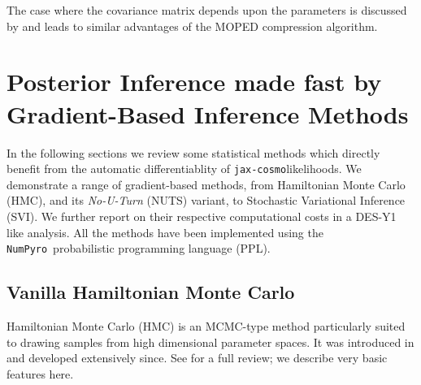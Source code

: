 \documentclass[twocolumn,twocolappendix,nofootinbib,iop]{openjournal}
\newcommand{\numpyro}{\texttt{NumPyro}}
\newcommand{\jaxcosmo}{\texttt{jax-cosmo}}
\begin{document}
%
The case where the covariance matrix depends upon the parameters is discussed by  \citet{2017MNRAS.472.4244H} and leads to similar advantages of the MOPED compression algorithm.

%
\section{Posterior Inference made fast by Gradient-Based Inference Methods}
\label{sec:chmc}
%
In the following sections we review some statistical methods which directly benefit from the automatic differentiablity of \jaxcosmo likelihoods. We demonstrate a range of gradient-based methods, from Hamiltonian Monte Carlo (HMC), and its \textit{No-U-Turn} (NUTS) variant, to Stochastic Variational Inference (SVI). We further report on their respective computational costs in a DES-Y1 like analysis. All  the methods have been implemented using the \numpyro\ probabilistic programming language (PPL). 
%
%
%
%
\subsection{Vanilla Hamiltonian Monte Carlo}
%
Hamiltonian Monte Carlo (HMC) is an MCMC-type method particularly suited to drawing
samples from high dimensional parameter spaces.  It was introduced in \citep{1987PhLB..195..216D}
and developed extensively since.  See \citet{betancourt} for a full review; we describe
very basic features here.
\end{document}
